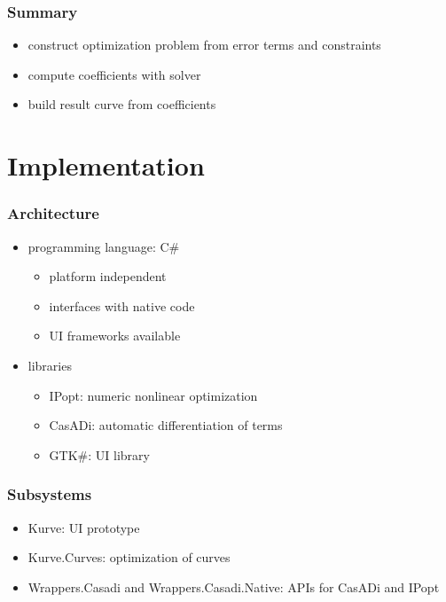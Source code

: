 \documentclass[mathserif]{beamer}
\begin{document}
		\begin{frame}
			\frametitle{Summary}
			\begin{itemize}
				\item construct optimization problem from error terms and constraints
				\item compute coefficients with solver
				\item build result curve from coefficients
			\end{itemize}
		\end{frame}

	\section{Implementation}

		\begin{frame}
			\frametitle{Architecture}
			\begin{itemize}
				\item programming language: C\#
				\begin{itemize}
					\item platform independent
					\item interfaces with native code
					\item UI frameworks available
				\end{itemize}
				\item libraries
				\begin{itemize}
					\item IPopt: numeric nonlinear optimization
					\item CasADi: automatic differentiation of terms
					\item GTK\#: UI library
				\end{itemize}
			\end{itemize}
		\end{frame}

		\begin{frame}
			\frametitle{Subsystems}
			\begin{itemize}
				\item Kurve: UI prototype
				\item Kurve.Curves: optimization of curves
				\item Wrappers.Casadi and Wrappers.Casadi.Native: APIs for CasADi and IPopt
			\end{itemize}
		\end{frame}
\end{document}

